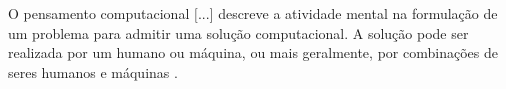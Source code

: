 



\begin{citacao}
  O pensamento computacional $[$...$]$ descreve a atividade mental na formulação de um problema para admitir 
uma solução computacional. A solução pode ser realizada por um humano ou máquina, 
ou mais geralmente, por combinações de seres humanos e máquinas \cite[tradução nossa]{Wing2010}.
\end{citacao}










